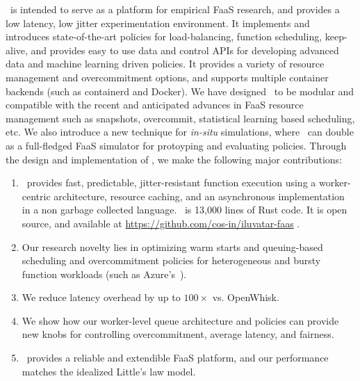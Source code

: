 \sysname~is intended to serve as a platform for empirical FaaS research, and provides a low latency, low jitter experimentation environment.
It implements and introduces state-of-the-art policies for load-balancing, function scheduling, keep-alive, and provides easy to use data and control APIs for developing advanced data and machine learning driven policies. 
It provides a variety of resource management and overcommitment options, and supports multiple container backends (such as containerd and Docker). 
We have designed \sysname~to be modular and compatible with the recent and anticipated advances in FaaS resource management such as snapshots, overcommit, statistical learning based scheduling, etc. 
We also introduce a new technique for \emph{in-situ} simulations, where \sysname~can double as a full-fledged  FaaS simulator for protoyping and evaluating policies.  
%
Through the design and implementation of \sysname, we make the following major contributions: 
\begin{enumerate}[wide,labelwidth=!,labelindent=0pt,topsep=0pt,itemsep=-1ex,partopsep=1ex,parsep=1ex]
\item \sysname~provides fast, predictable, jitter-resistant function execution using a worker-centric architecture, resource caching, and an asynchronous implementation in a non garbage collected language.  \sysname~is 13,000 lines of Rust code. It is open source, and available at \url{https://github.com/cos-in/iluvatar-faas} . 
\item Our research novelty lies in optimizing warm starts and queuing-based scheduling and overcommitment policies for heterogeneous and bursty function workloads (such as Azure's~\cite{shahrad_serverless_2020}). 
\item We reduce latency overhead by up to $100\times$ vs. OpenWhisk. 
\item We show how our worker-level queue architecture and policies can provide new knobs for controlling overcommitment, average latency, and fairness. 
\item \sysname~provides a reliable and extendible FaaS platform, and our performance matches the idealized Little's law model. 
\end{enumerate}


